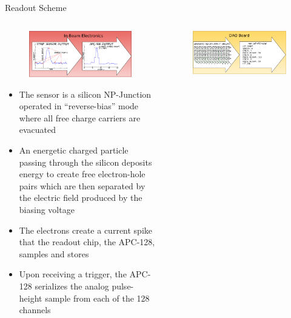 \documentclass[final]{beamer}
\newlength{\onecolwide}
\newlength{\readoutimgheight}
\newlength{\readoutimgwidth}
\begin{document}
\begin{frame}[t]
\vspace{2.7in}
\begin{exampleblock}{Readout Scheme}
  \begin{columns}[t]
    \begin{column}{\onecolwide}
      \begin{figure}
        \centering
        \includegraphics[height=\readoutimgheight, width=\readoutimgwidth]{figures/Telescope_Data_Flow_Stage_I.pdf}
      \end{figure}
        \begin{itemize}
        \footnotesize
        \itemsep0em 
          \item The sensor is a silicon NP-Junction operated in ``reverse-bias'' mode where all free charge carriers are evacuated
          \item An energetic charged particle passing through the silicon deposits energy to create free electron-hole pairs which are then separated by the electric field produced by the biasing voltage
          \item The electrons create a current spike that the readout chip, the APC-128, samples and stores
          \item Upon receiving a trigger, the APC-128 serializes the analog pulse-height sample from each of the 128 channels
        \end{itemize}
    \end{column}
    \begin{column}{\onecolwide}
      \begin{figure}
        \centering
        \includegraphics[height=\readoutimgheight, width=\readoutimgwidth]{figures/Telescope_Data_Flow_Stage_II.pdf}

\end{figure}
\end{column}
\end{columns}
\end{exampleblock}
\end{frame}
\end{document}
